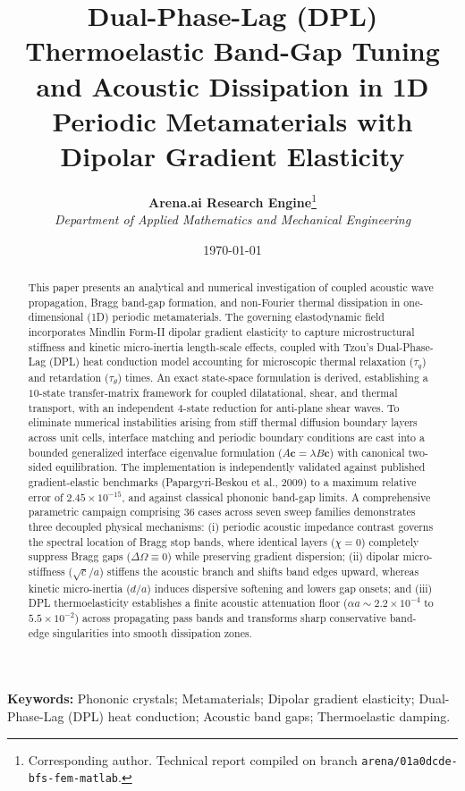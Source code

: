 \documentclass[11pt,a4paper]{article}
\title{\textbf{Dual-Phase-Lag (DPL) Thermoelastic Band-Gap Tuning and Acoustic Dissipation in 1D Periodic Metamaterials with Dipolar Gradient Elasticity}}
\author{
  \textbf{Arena.ai Research Engine}\footnote{Corresponding author. Technical report compiled on branch \texttt{arena/01a0dcde-bfs-fem-matlab}.}\\
  \textit{Department of Applied Mathematics and Mechanical Engineering}
}
\date{\today}
\begin{document}
\maketitle

\begin{abstract}
This paper presents an analytical and numerical investigation of coupled acoustic wave propagation, Bragg band-gap formation, and non-Fourier thermal dissipation in one-dimensional (1D) periodic metamaterials. The governing elastodynamic field incorporates Mindlin Form-II dipolar gradient elasticity to capture microstructural stiffness and kinetic micro-inertia length-scale effects, coupled with Tzou's Dual-Phase-Lag (DPL) heat conduction model accounting for microscopic thermal relaxation ($\tau_q$) and retardation ($\tau_\theta$) times. An exact state-space formulation is derived, establishing a $10$-state transfer-matrix framework for coupled dilatational, shear, and thermal transport, with an independent $4$-state reduction for anti-plane shear waves. To eliminate numerical instabilities arising from stiff thermal diffusion boundary layers across unit cells, interface matching and periodic boundary conditions are cast into a bounded generalized interface eigenvalue formulation ($A\mathbf{c} = \lambda B\mathbf{c}$) with canonical two-sided equilibration. The implementation is independently validated against published gradient-elastic benchmarks (Papargyri-Beskou et al., 2009) to a maximum relative error of $2.45 \times 10^{-15}$, and against classical phononic band-gap limits. A comprehensive parametric campaign comprising 36 cases across seven sweep families demonstrates three decoupled physical mechanisms: (i) periodic acoustic impedance contrast governs the spectral location of Bragg stop bands, where identical layers ($\chi=0$) completely suppress Bragg gaps ($\Delta\Omega \equiv 0$) while preserving gradient dispersion; (ii) dipolar micro-stiffness ($\sqrt{c}/a$) stiffens the acoustic branch and shifts band edges upward, whereas kinetic micro-inertia ($d/a$) induces dispersive softening and lowers gap onsets; and (iii) DPL thermoelasticity establishes a finite acoustic attenuation floor ($\alpha a \sim 2.2 \times 10^{-4}$ to $5.5 \times 10^{-2}$) across propagating pass bands and transforms sharp conservative band-edge singularities into smooth dissipation zones.
\end{abstract}

\textbf{Keywords:} Phononic crystals; Metamaterials; Dipolar gradient elasticity; Dual-Phase-Lag (DPL) heat conduction; Acoustic band gaps; Thermoelastic damping.
\end{document}
